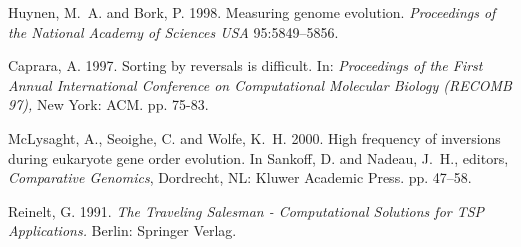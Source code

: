 \documentclass{article}
\begin{document}
\footnotesize
 \begin{thebibliography}{99}

 Huynen, M.~A. and Bork, P. 1998. Measuring genome evolution. {\em
Proceedings of the National Academy of Sciences USA}
  95:5849--5856.

 Caprara, A. 1997. Sorting by reversals is difficult. In: {\em
Proceedings of the First Annual International Conference on Computational
Molecular Biology (RECOMB 97),} New York: ACM.  pp. 75-83.

McLysaght, A., Seoighe, C. and Wolfe, K.~H. 2000. High frequency
of inversions during eukaryote gene order evolution.     In Sankoff, D. and
Nadeau, J.~H., editors, {\em Comparative Genomics},  Dordrecht, NL: Kluwer
Academic Press. pp. 47--58.

 Reinelt, G. 1991. {\em The Traveling Salesman - Computational
Solutions for TSP Applications.} Berlin: Springer Verlag.

\end{thebibliography}



%
\end{document}

